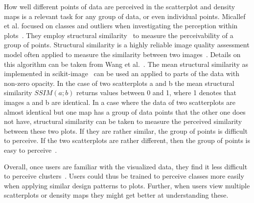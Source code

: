 How well different points of data are perceived in the scatterplot and density maps is a relevant task for any group of data, or even individual points. Micallef et al. focused on classes and outliers when investigating the perception within plots~\cite{micallef2017towards}.
They employ structural similarity~\cite{wang2004image} to measure the perceivability of a group of points. Structural similarity is a highly reliable image quality assessment model often applied to measure the similarity between two images~\cite{micallef2017towards}. Details on this algorithm can be taken from Wang et al.~\cite{wang2004image}.
The mean structural similarity as implemented in scikit-image~\cite{van2014scikit} can be used an applied to parts of the data with non-zero opacity. In the case of two scatterplots a and b the mean structural similarity $SSIM(a;b)$ returns values between 0 and 1, where 1 denotes that images a and b are identical.
In a case where the data of two scatterplots are almost identical but one map has a group of data points that the other one does not have, structural similarity can be taken to measure the perceived similarity between these two plots. If they are rather similar, the group of points is difficult to perceive. If the two scatterplots are rather different, then the group of points is easy to perceive~\cite{micallef2017towards}.

Overall, once users are familiar with the visualized data, they find it less difficult to perceive clusters~\cite{van2017evaluating}. Users could thus be trained to perceive classes more easily when applying similar design patterns to plots. Further, when users view multiple scatterplots or density maps they might get better at understanding these.
